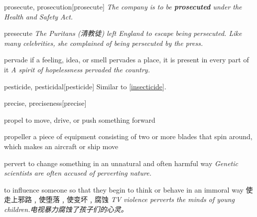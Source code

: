 \begin{word}{prosecute, prosecution}[prosecute]
    \textit{The company is to be \textbf{prosecuted} under the Health and Safety Act.}
\end{word}

\begin{word}{presecute}
    \textit{The Puritans (清教徒) left England to escape being persecuted. Like many celebrities, she complained of being persecuted by the press.}
\end{word}

\begin{word}{pervade}
    if a feeling, idea, or smell pervades a place, it is present in every part of it
    \textit{A spirit of hopelessness pervaded the country.}
\end{word}

\begin{word}{pesticide, pesticidal}[pesticide]
    Similar to \ref{insecticide}.
\end{word}


\begin{word}{precise, preciseness}[precise]
\end{word}

\begin{word}{propel}
    to move, drive, or push something forward
\end{word}


\begin{word}{propeller}
    a piece of equipment consisting of two or more blades that spin around, which makes an aircraft or ship move
\end{word}

\begin{word}{pervert}
    to change something in an unnatural and often harmful way
    \textit{Genetic scientists are often accused of perverting nature.}

    to influence someone so that they begin to think or behave in an immoral way 使走上邪路﹐使堕落﹐使变坏﹐腐蚀
    \textit{TV violence perverts the minds of young children.电视暴力腐蚀了孩子们的心灵。}
\end{word}

